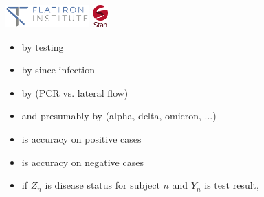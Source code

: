 \documentclass[9pt]{report}
\begin{document}
\sf%
\mbox{ }
\\[12pt]
\\[4pt]
\\[36pt]
\noindent
{}
\\[2pt]
\\[2pt]
\vfill
\noindent
{} \hfill
\includegraphics[height=24pt]{img/flatiron-logo.png}
\hfill
\includegraphics[height=24pt]{img/stan-logo.png}


\begin{itemize}
\item by testing 
\item by  since infection
\item by  (PCR vs. lateral flow)
\item and presumably by  (alpha, delta, omicron, $\ldots$)
\end{itemize}

\begin{itemize}
\item {} is accuracy on positive cases
\item {} is accuracy on negative cases
\item if $Z_n$ is disease status for subject $n$ and $Y_n$ is test result,
\end{itemize}
\end{document}

